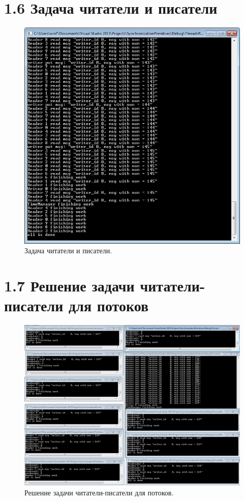 \documentclass[a4paper,12pt]{article} %
\begin{document}
\newpage

\section*{1.6 Задача читатели и писатели}

\begin{figure}[h!]
\centering
\includegraphics[scale=1]{res/006}
\caption{Задача читатели и писатели.}
\end{figure}

\newpage

\section*{1.7 Решение задачи читатели-писатели для потоков}

\begin{figure}[h!]
\centering
\includegraphics[scale=0.50]{res/007}
\caption{Решение задачи читатели-писатели для потоков.}
\end{figure}
\end{document}
